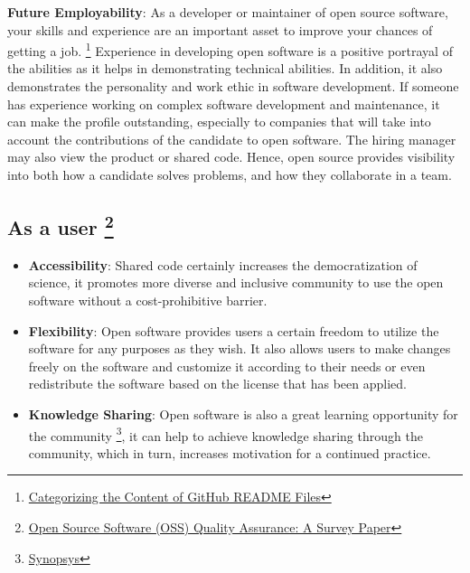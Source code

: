 \documentclass[
  letterpaper,
  DIV=11,
  numbers=noendperiod]{scrreport}
\providecommand{\tightlist}{%
  \setlength{\itemsep}{0pt}\setlength{\parskip}{0pt}}\usepackage{longtable,booktabs,array}
\begin{document}
\begin{itemize}
  \textbf{Future Employability}: As a developer or maintainer of open
  source software, your skills and experience are an important asset to
  improve your chances of getting a job. \footnote{\href{https://link.springer.com/article/10.1007/s10664-018-9660-3}{Categorizing
    the Content of GitHub README Files}} Experience in developing open
  software is a positive portrayal of the abilities as it helps in
  demonstrating technical abilities. In addition, it also demonstrates
  the personality and work ethic in software development. If someone has
  experience working on complex software development and maintenance, it
  can make the profile outstanding, especially to companies that will
  take into account the contributions of the candidate to open software.
  The hiring manager may also view the product or shared code. Hence,
  open source provides visibility into both how a candidate solves
  problems, and how they collaborate in a team.
\end{itemize}

\hypertarget{as-a-user-salem}{%
\subsection[As a user ]{\texorpdfstring{As a user
\footnote{\href{https://www.sciencedirect.com/science/article/pii/S1877050915017172}{Open
  Source Software (OSS) Quality Assurance: A Survey Paper}}}{As a user }}\label{as-a-user-salem}}

\begin{itemize}
\tightlist
\item
  \textbf{Accessibility}: Shared code certainly increases the
  democratization of science, it promotes more diverse and inclusive
  community to use the open software without a cost-prohibitive barrier.
\item
  \textbf{Flexibility}: Open software provides users a certain freedom
  to utilize the software for any purposes as they wish. It also allows
  users to make changes freely on the software and customize it
  according to their needs or even redistribute the software based on
  the license that has been applied.
\item
  \textbf{Knowledge Sharing}: Open software is also a great learning
  opportunity for the community \footnote{\href{https://www.synopsys.com/glossary/what-is-open-source-software.html\#:~:text=Open\%20source\%20fosters\%20ingenuity\%3B\%20programmers,learning\%20opportunities\%20for\%20new\%20programmers.}{Synopsys}},
  it can help to achieve knowledge sharing through the community, which
  in turn, increases motivation for a continued practice.
\end{itemize}
\end{document}
